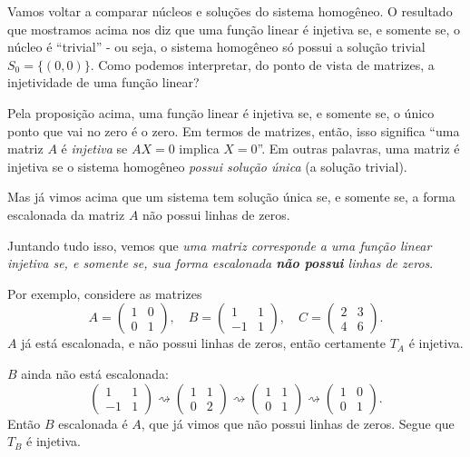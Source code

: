 \begin{ex}
	Vamos voltar a comparar núcleos e soluções do sistema homogêneo. O resultado que mostramos acima nos diz que uma função linear é injetiva se, e somente se, o núcleo é ``trivial'' - ou seja, o sistema homogêneo só possui a solução trivial $S_0=\{(0,0)\}$. Como podemos interpretar, do ponto de vista de matrizes, a injetividade de uma função linear?
	
	Pela proposição acima, uma função linear é injetiva se, e somente se, o único ponto que vai no zero é o zero. Em termos de matrizes, então, isso significa ``uma matriz $A$ é \textit{injetiva} se $AX=0$ implica $X=0$''. Em outras palavras, uma matriz é injetiva se o sistema homogêneo \textit{possui solução única} (a solução trivial).
	
	Mas já vimos acima que um sistema tem solução única se, e somente se, a forma escalonada da matriz $A$ não possui linhas de zeros.
	
	Juntando tudo isso, vemos que \textit{uma matriz corresponde a uma função linear injetiva se, e somente se, sua forma escalonada \textbf{não possui} linhas de zeros}.
	
	\tcblower
	
	Por exemplo, considere as matrizes 
	\[A=\begin{pmatrix}
	1&0\\0&1
	\end{pmatrix},\quad B=\begin{pmatrix}
	1&1\\
	-1&1
	\end{pmatrix},\quad C=\begin{pmatrix}
	2&3\\
	4&6
	\end{pmatrix}.\] $A$ já está escalonada, e não possui linhas de zeros, então certamente $T_A$ é injetiva.
	
	$B$ ainda não está escalonada:
	\[\begin{pmatrix}
	1&1\\-1&1
	\end{pmatrix}\rightsquigarrow\begin{pmatrix}
	1&1\\0&2
	\end{pmatrix}\rightsquigarrow\begin{pmatrix}
	1&1\\0&1
	\end{pmatrix}\rightsquigarrow\begin{pmatrix}
	1&0\\0&1
	\end{pmatrix}.\] Então $B$ escalonada é $A$, que já vimos que não possui linhas de zeros. Segue que $T_B$ é injetiva.
	

\end{ex}
